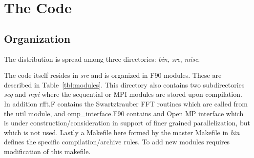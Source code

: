 \documentclass[11pt,a4paper]{article}
\begin{document}
\section{The Code}

\subsection{Organization}

The distribution is spread among three directories: \emph{bin},
\emph{src}, \emph{misc}.  

The code itself resides in \emph{src} and is organized in F90 modules.
These are described in Table~\ref{tbl:modules}.  This directory also
contains two subdirectories \emph{seq} and \emph{mpi} where the
sequential or MPI modules are stored upon compilation.  In addition
rfft.F contains the Swartztrauber FFT routines which are called from
the util module, and omp\_interface.F90 contains and Open MP interface
which is under construction/consideration in support of finer grained
parallelization, but which is not used.  Lastly a Makefile here formed
by the master Makefile in \emph{bin} defines the specific
compilation/archive rules.  To add new modules requires modification
of this makefile.
\end{document}
